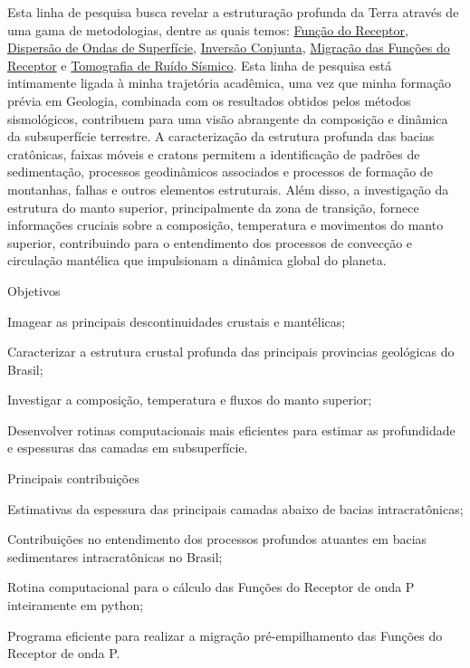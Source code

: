 \documentclass[10pt,a4paper,oneside]{book}
\begin{document}
\bigskip

Esta linha de pesquisa busca revelar a estruturação profunda da Terra através de uma gama de metodologias, dentre as quais temos: \href{https://doi.org/10.1029/JB084iB09p04749}{Função do Receptor}, \href{https://doi.org/10.1111/j.1365-246X.1990.tb04573.x}{Dispersão de Ondas de Superfície}, \href{https://doi.org/10.1046/j.1365-246x.2000.00217.x}{Inversão Conjunta}, \href{https://doi.org/10.1016/j.epsl.2013.08.025}{Migração das Funções do Receptor} e \href{https://doi.org/10.1111/j.1365-246X.2007.03374.x}{Tomografia de Ruído Sísmico}. Esta linha de pesquisa está intimamente ligada à minha trajetória acadêmica, uma vez que minha formação prévia em Geologia, combinada com os resultados obtidos pelos métodos sismológicos, contribuem para uma visão abrangente da composição e dinâmica da subsuperfície terrestre. A caracterização da estrutura profunda das bacias cratônicas, faixas móveis e cratons permitem a identificação de padrões de sedimentação, processos geodinâmicos associados e processos de formação de montanhas, falhas e outros elementos estruturais. Além disso, a investigação da estrutura do manto superior, principalmente da zona de transição, fornece informações cruciais sobre a composição, temperatura e movimentos do manto superior, contribuindo para o entendimento dos processos de convecção e circulação mantélica que impulsionam a dinâmica global do planeta.  

\begin{fancyenum}{\faFutbol}{Objetivos}
	\item Imagear as principais descontinuidades crustais e mantélicas;
	\item Caracterizar a estrutura crustal profunda das principais provincias geológicas do Brasil;
	\item Investigar a composição, temperatura e fluxos do manto superior;
	\item Desenvolver rotinas computacionais mais eficientes para estimar as profundidade e espessuras das camadas em subsuperfície.
\end{fancyenum}

\begin{fancyenum}{\faCogs}{Principais contribuições}
	\item Estimativas da espessura das principais camadas abaixo de bacias intracratônicas;
	\item Contribuições no entendimento dos processos profundos atuantes em bacias sedimentares intracratônicas no Brasil;
	\item Rotina computacional para o cálculo das Funções do Receptor de onda P inteiramente em python;
	\item Programa eficiente para realizar a migração pré-empilhamento das Funções do Receptor de onda P.
\end{fancyenum}
\end{document}

